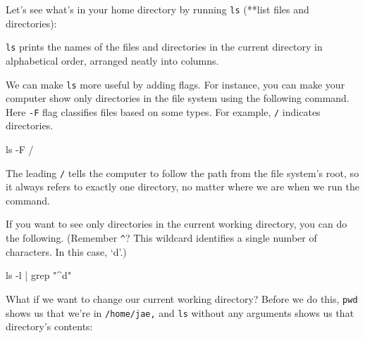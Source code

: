 \documentclass[
  letterpaper,
  DIV=11,
  numbers=noendperiod]{scrreprt}
\newenvironment{Shaded}{\begin{snugshade}}{\end{snugshade}}
\newcommand{\AttributeTok}[1]{\textcolor[rgb]{0.40,0.45,0.13}{#1}}
\newcommand{\ExtensionTok}[1]{\textcolor[rgb]{0.00,0.23,0.31}{#1}}
\newcommand{\FunctionTok}[1]{\textcolor[rgb]{0.28,0.35,0.67}{#1}}
\newcommand{\KeywordTok}[1]{\textcolor[rgb]{0.00,0.23,0.31}{#1}}
\newcommand{\NormalTok}[1]{\textcolor[rgb]{0.00,0.23,0.31}{#1}}
\newcommand{\StringTok}[1]{\textcolor[rgb]{0.13,0.47,0.30}{#1}}
\begin{document}
Let's see what's in your home directory by running \texttt{ls} (**list
files and directories):

\begin{Shaded}
\end{Shaded}

\texttt{ls} prints the names of the files and directories in the current
directory in alphabetical order, arranged neatly into columns.

We can make \texttt{ls} more useful by adding flags. For instance, you
can make your computer show only directories in the file system using
the following command. Here \texttt{-F} flag classifies files based on
some types. For example, \texttt{/} indicates directories.

\begin{Shaded}
\begin{Highlighting}[]
\FunctionTok{ls} \AttributeTok{{-}F}\NormalTok{ /}
\end{Highlighting}
\end{Shaded}

The leading \texttt{/} tells the computer to follow the path from the
file system's root, so it always refers to exactly one directory, no
matter where we are when we run the command.

If you want to see only directories in the current working directory,
you can do the following. (Remember \texttt{\^{}}? This wildcard
identifies a single number of characters. In this case, `d'.)

\begin{Shaded}
\begin{Highlighting}[]
\FunctionTok{ls} \AttributeTok{{-}l} \KeywordTok{|} \FunctionTok{grep} \StringTok{"\^{}d"}
\end{Highlighting}
\end{Shaded}

What if we want to change our current working directory? Before we do
this, \texttt{pwd} shows us that we're in \texttt{/home/jae,} and
\texttt{ls} without any arguments shows us that directory's contents:
\end{document}
